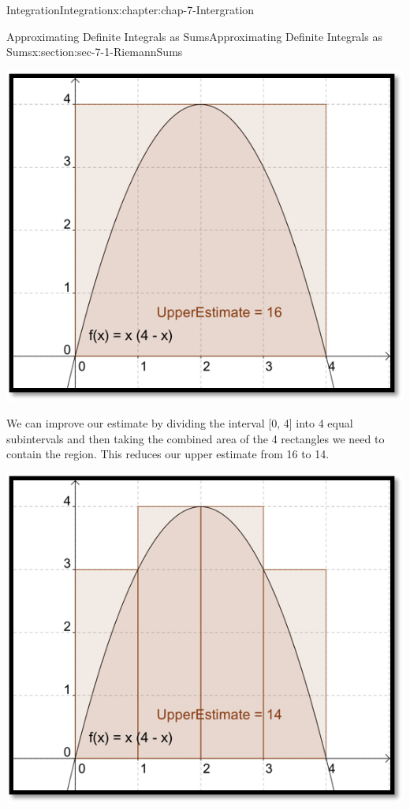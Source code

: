 \documentclass[oneside,10pt,]{book}
\numberwithin{equation}{section}
\begin{document}
\begin{chapterptx}{Integration}{}{Integration}{}{}{x:chapter:chap-7-Intergration}
\begin{sectionptx}{Approximating Definite Integrals as Sums}{}{Approximating Definite Integrals as Sums}{}{}{x:section:sec-7-1-RiemannSums}
\begin{sidebyside}{1}{0.2}{0.2}{0}%
\begin{sbspanel}{0.6}%
\includegraphics[width=\linewidth]{images/sec7-1-3.png}
\end{sbspanel}%
\end{sidebyside}%
\par
We can improve our estimate by dividing the interval [0, 4] into 4 equal subintervals and then taking the combined area of the 4 rectangles we need to contain the region.  This reduces our upper estimate from 16 to 14.%
\begin{sidebyside}{1}{0.2}{0.2}{0}%
\begin{sbspanel}{0.6}%
\includegraphics[width=\linewidth]{images/sec7-1-4.png}

\end{sbspanel}
\end{sidebyside}
\end{sectionptx}
\end{chapterptx}
\end{document}
